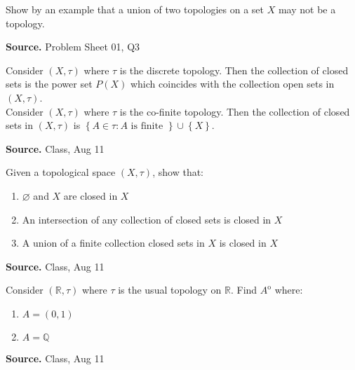 \documentclass[12pt,twoside]{report}
\newenvironment*{source}{\hfill\scriptsize\textbf{Source.}\space}{\par}
\begin{document}
\begin{samepage}
\begin{ex}
Show by an example that a union of two topologies on a set $X$ may not be a topology.
\end{ex}
\begin{source}
Problem Sheet 01, Q3
\end{source}
\end{samepage}

\begin{samepage}
\begin{ex}
Consider $\left (X, \tau\right )$ where $\tau$ is the discrete topology. Then the collection of closed sets is the power set $P\left (X\right )$ which coincides with the collection open sets in $\left (X, \tau\right )$.\\
Consider $\left (X, \tau\right )$ where $\tau$ is the co-finite topology. Then the collection of closed sets in $\left (X, \tau\right )$ is $ \left\{ A \in \tau  :  A \text{ is finite } \right\} \cup \left\{ X \right\} $.
\end{ex}
\begin{source}
Class, Aug 11
\end{source}
\end{samepage}

\begin{samepage}
\begin{ex}
 Given a topological space $\left (X, \tau\right )$, show that:
    \begin{enumerate}
        \item $\varnothing$ and $X$ are closed in $X$
        \item An intersection of any collection of closed sets is closed in $X$
        \item A union of a finite collection closed sets in $X$ is closed in $X$
    \end{enumerate}
\end{ex}
\begin{source}
Class, Aug 11
\end{source}
\end{samepage}

\begin{samepage}
\begin{ex}
Consider $\left (\mathbb{R}, \tau\right )$ where $\tau$ is the usual topology on $\mathbb{R}$.
Find $A^\mathrm{o}$ where:
    \begin{enumerate}
        \item $A = \left (0,1\right )$
        \item $A = \mathbb{Q}$
    \end{enumerate}
\end{ex}
\begin{source}
Class, Aug 11
\end{source}
\end{samepage}
\end{document}
